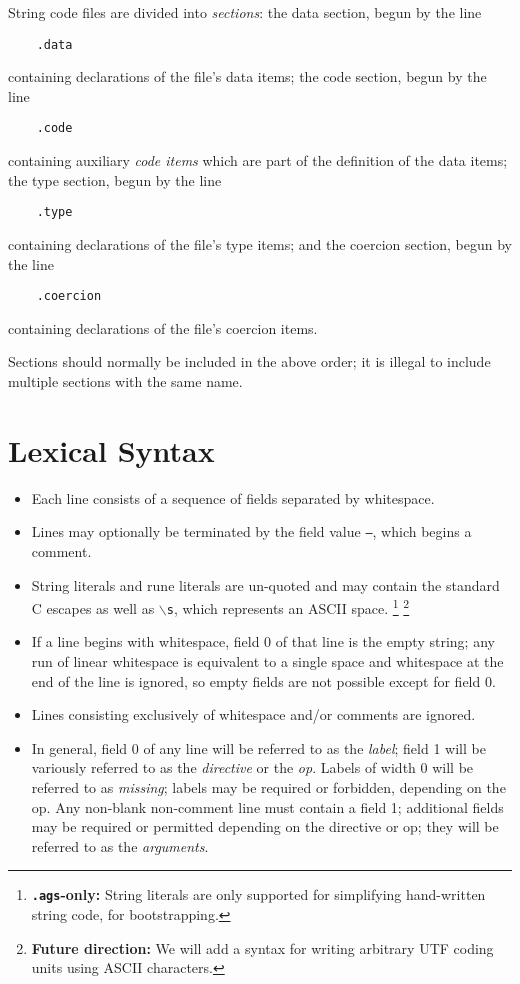 \documentclass{report}
\newcommand\bs{$\backslash$}
\newcommand\stringcode[1]{\texttt{#1}}
\newcommand\agsonly[1]{\footnote{\textbf{\texttt{.ags}-only: }#1}}
\newcommand\future[1]{\footnote{\textbf{Future direction:} #1}}
\begin{document}
String code files are divided into \emph{sections}:
the data section, begun by the line
\begin{verbatim}
	.data
\end{verbatim}
containing declarations of the file's data items;
the code section, begun by the line
\begin{verbatim}
	.code
\end{verbatim}
containing auxiliary \emph{code items} which are part of the definition of the data items;
the type section, begun by the line
\begin{verbatim}
	.type
\end{verbatim}
containing declarations of the file's type items;
and the coercion section, begun by the line
\begin{verbatim}
	.coercion
\end{verbatim}
containing declarations of the file's coercion items.

Sections should normally be included in the above order;
it is illegal to include multiple sections with the same name.

\section{Lexical Syntax}

\begin{itemize}
    \item Each line consists of a sequence of fields separated by whitespace.

    \item Lines may optionally be terminated by the field value \stringcode{--}, which begins a comment.

    \item String literals and rune literals are un-quoted and may contain the standard C escapes as well as
        \stringcode{\bs{}s}, which represents an ASCII space.
        \agsonly{String literals are only supported for simplifying hand-written string code, for bootstrapping.}
        \future{We will add a syntax for writing arbitrary UTF coding units using ASCII characters.}

    \item If a line begins with whitespace, field 0 of that line is the empty string;
        any run of linear whitespace is equivalent to a single space and whitespace at the end of the line is ignored,
        so empty fields are not possible except for field 0.

    \item Lines consisting exclusively of whitespace and/or comments are ignored.

    \item In general, field 0 of any line will be referred to as the \emph{label};
        field 1 will be variously referred to as the \emph{directive} or the \emph{op}.
        Labels of width 0 will be referred to as \emph{missing};
        labels may be required or forbidden, depending on the op.
        Any non-blank non-comment line must contain a field 1;
        additional fields may be required or permitted depending on the directive or op;
        they will be referred to as the \emph{arguments}.
\end{itemize}
\end{document}
